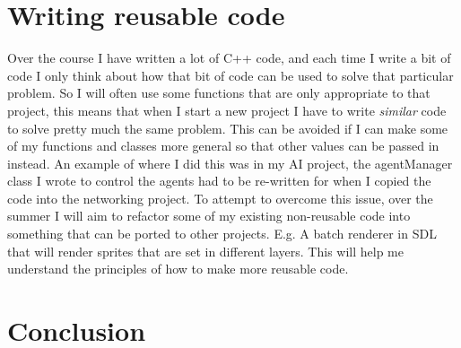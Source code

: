\documentclass{scrartcl}
\begin{document}
\section{Writing reusable code}
Over the course I have written a lot of C++ code, and each time I write a bit of code I only think about how that bit of code can be used to solve that particular problem. So I will often use some functions that are only appropriate to that project, this means that when I start a new project I have to write \textit{similar} code to solve pretty much the same problem. This can be avoided if I can make some of my functions and classes more general so that other values can be passed in instead. An example of where I did this was in my AI project, the agentManager class I wrote to control the agents had to be re-written for when I copied the code into the networking project.
To attempt to overcome this issue, over the summer I will aim to refactor some of my existing non-reusable code into something that can be ported to other projects. E.g. A batch renderer in SDL that will render sprites that are set in different layers. This will help me understand the principles of how to make more reusable code.

\section{Conclusion}
\end{document}
